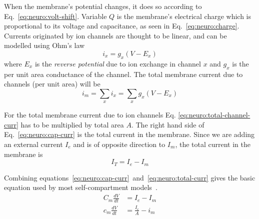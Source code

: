 When the membrane's potential changes, it does so according to Eq.~\ref{eq:neuro:volt-shift}. Variable $Q$ is the membrane's electrical charge which is proportional to its voltage and capacitance, as seen in Eq.~\ref{eq:neuro:charge}.
Currents originated by ion channels are thought to be linear, and can be modelled using Ohm's law
\begin{equation}
i_{x} = g_{x}(V - E_{x}) 
\label{eq:neuro:single-channel-curr}
\end{equation}
where $E_{x}$ is the \emph{reverse potential} due to ion exchange in channel $x$ and $g_{x}$ is the per unit area conductance of the channel. The total membrane current due to channels (per unit area) will be 
\begin{equation}
i_{m} = \sum_{x} i_{x} = \sum_{x} g_{x}(V - E_{x}) \label{eq:neuro:total-channel-curr}
\end{equation}

For the total membrane current due to ion channels Eq. \ref{eq:neuro:total-channel-curr} has to be multiplied by total area $A$.
The right hand side of Eq.~\ref{eq:neuro:cap-curr} is the total current in the membrane. Since we are adding an external current $I_{e}$ and is of opposite direction to $I_{m}$, the total current in the membrane is
\begin{equation}
I_{T} = I_{e} - I_{m} 
\label{eq:neuro:total-curr}
\end{equation}

Combining equations~\ref{eq:neuro:cap-curr}~and~\ref{eq:neuro:total-curr} gives the basic equation used by most self-compartment models~\cite{dayan2001theoretical}.
\begin{align}
C_{m} \frac{dV}{dt} &= I_{e} - I_{m} 
\label{eq:neuro:basic-self-compartment} \\[0.5em]
c_{m} \frac{dV}{dt} &= \frac{I_{e}}{A} - i_{m}
\label{eq:neuro:basic-pu-self-compartment}
\end{align}


